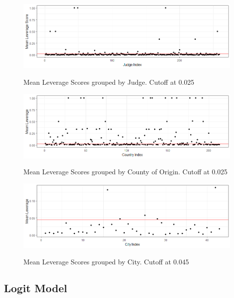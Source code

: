 \documentclass{article}
\begin{document}
	
	\begin{figure}[h]
		\centering
		\caption{Mean Leverage Scores grouped by Judge. Cutoff at 0.025}
		\includegraphics[width=\textwidth]{judge_leverages.jpg}
		\label{fig:judge_leverages}
	\end{figure}
	
	
	\begin{figure}[h]
		\centering
		\caption{Mean Leverage Scores grouped by County of Origin. Cutoff at 0.025}
		\includegraphics[width=\textwidth]{county_leverages.jpg}
		\label{fig:county_leverages}
	\end{figure}
	
	\begin{figure}[h]
		\centering
		\caption{Mean Leverage Scores grouped by City. Cutoff at 0.045}
		\includegraphics[width=\textwidth]{city_leverages.jpg}
		\label{fig:city_leverages}
	\end{figure}
	
	
	
	\subsection{Logit Model}
	
\end{document}

